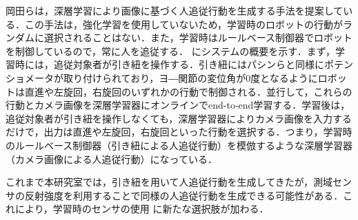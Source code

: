   \vspace{0.5cm}

  岡田ら\cite{okada}は，深層学習により画像に基づく人追従行動を生成する手法を提案している．この手法は，強化学習を使用していないため，学習時のロボットの行動がランダムに選択されることはない．また，学習時はルールベース制御器でロボットを制御しているので，常に人を追従する．
  にシステムの概要を示す．まず，学習時には，追従対象者が引き紐を操作する．引き紐にはパシンらと同様にポテンショメータが取り付けられており，ヨ―関節の変位角が0度となるようにロボットは直進や左旋回，右旋回のいずれかの行動で制御される．並行して，これらの行動とカメラ画像を深層学習器にオンラインでend-to-end学習する．学習後は，追従対象者が引き紐を操作しなくても，深層学習器によりカメラ画像を入力するだけで，出力は直進や左旋回，右旋回といった行動を選択する．つまり，学習時のルールベース制御器（引き紐による人追従行動）を模倣するような深層学習器（カメラ画像による人追従行動）になっている．

  これまで本研究室では，引き紐を用いて人追従行動を生成してきたが，測域センサの反射強度を利用することで同様の人追従行動を生成できる可能性がある．これにより，学習時のセンサの使用
  に新たな選択肢が加わる．

\newpage

\vspace{2cm}

